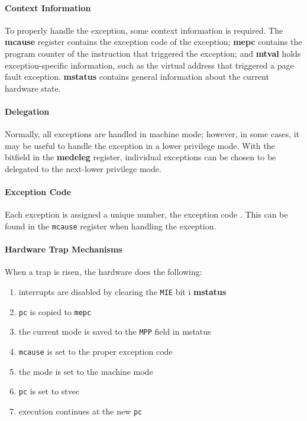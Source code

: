 
\paragraph{Context Information} To properly handle the exception, some context information is required.
The \textbf{mcause} register contains the exception code of the exception; \textbf{mepc} contains
the program counter of the instruction that triggered the exception; and \textbf{mtval} holds
exception-specific information, such as the virtual address that triggered a page fault exception.
\textbf{mstatus} contains general information about the current hardware state.

\paragraph{Delegation} Normally, all exceptions are handled in machine mode; however, in some cases,
it may be useful to handle the exception in a lower privilege mode. With the bitfield in the
\textbf{medeleg} register, individual exceptions can be chosen to be delegated to the next-lower
privilege mode.

\paragraph{Exception Code} Each exception is assigned a unique number, the exception code \cite{riscvreader}.
This can be found in the \texttt{mcause} register when handling the exception.



\paragraph{Hardware Trap Mechanisms} When a trap is risen, the hardware does the following: \cite{cox2011xv6}
\begin{enumerate}
    \item interrupts are disabled by clearing the \texttt{MIE} bit i    \textbf{mstatus}
    \item \texttt{pc} is copied to \texttt{mepc}
    \item the current mode is saved to the \texttt{MPP} field in mstatus
    \item \texttt{mcause} is set to the proper exception code
    \item the mode is set to the machine mode
    \item \texttt{pc} is set to stvec
    \item execution continues at the new \texttt{pc}
\end{enumerate}

